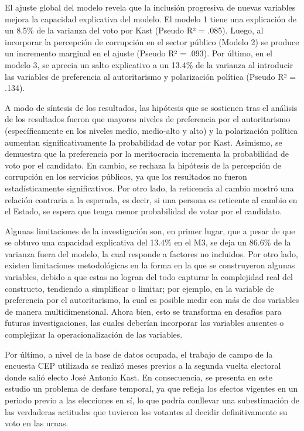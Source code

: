 \documentclass[
  spanish,
  a4paper,
  oneside]{scrbook}
\begin{document}
El ajuste global del modelo revela que la inclusión progresiva de nuevas
variables mejora la capacidad explicativa del modelo. El modelo 1 tiene
una explicación de un 8.5\% de la varianza del voto por Kast (Pseudo R²
= .085). Luego, al incorporar la percepción de corrupción en el sector
público (Modelo 2) se produce un incremento marginal en el ajuste
(Pseudo R² = .093). Por último, en el modelo 3, se aprecia un salto
explicativo a un 13.4\% de la varianza al introducir las variables de
preferencia al autoritarismo y polarización política (Pseudo R² = .134).

A modo de síntesis de los resultados, las hipótesis que se sostienen
tras el análisis de los resultados fueron que mayores niveles de
preferencia por el autoritarismo (específicamente en los niveles medio,
medio-alto y alto) y la polarización política aumentan
significativamente la probabilidad de votar por Kast. Asimismo, se
demuestra que la preferencia por la meritocracia incrementa la
probabilidad de voto por el candidato. En cambio, se rechaza la
hipótesis de la percepción de corrupción en los servicios públicos, ya
que los resultados no fueron estadísticamente significativos. Por otro
lado, la reticencia al cambio mostró una relación contraria a la
esperada, es decir, si una persona es reticente al cambio en el Estado,
se espera que tenga menor probabilidad de votar por el candidato.

Algunas limitaciones de la investigación son, en primer lugar, que a
pesar de que se obtuvo una capacidad explicativa del 13.4\% en el M3, se
deja un 86.6\% de la varianza fuera del modelo, la cual responde a
factores no incluidos. Por otro lado, existen limitaciones metodológicas
en la forma en la que se construyeron algunas variables, debido a que
estas no logran del todo capturar la complejidad real del constructo,
tendiendo a simplificar o limitar; por ejemplo, en la variable de
preferencia por el autoritarismo, la cual es posible medir con más de
dos variables de manera multidimensional. Ahora bien, esto se transforma
en desafíos para futuras investigaciones, las cuales deberían incorporar
las variables ausentes o complejizar la operacionalización de las
variables.

Por último, a nivel de la base de datos ocupada, el trabajo de campo de
la encuesta CEP utilizada se realizó meses previos a la segunda vuelta
electoral donde salió electo José Antonio Kast. En consecuencia, se
presenta en este estudio un problema de desfase temporal, ya que refleja
los efectos vigentes en un periodo previo a las elecciones en sí, lo que
podría conllevar una subestimación de las verdaderas actitudes que
tuvieron los votantes al decidir definitivamente su voto en las urnas.
\end{document}
